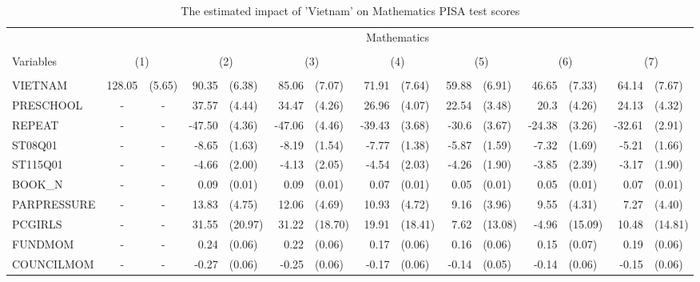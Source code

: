 \documentclass[10pt]{article}
\begin{document}
	
	\begin{table}[htbp]
		\footnotesize
		\def\arraystretch{1}
		\def\tabcolsep{4}
		\centering
		\caption{The estimated impact of 'Vietnam' on Mathematics PISA test scores}
    \begin{tabular}{lrlrlrlrlrlrlrl}
    \toprule
    \midrule
          & \multicolumn{14}{c}{Mathematics} \\
          \cline{2-15} \\
    Variables & \multicolumn{2}{c}{(1)} & \multicolumn{2}{c}{(2)} & \multicolumn{2}{c}{(3)} & \multicolumn{2}{c}{(4)} & \multicolumn{2}{c}{(5)} & \multicolumn{2}{c}{(6)} & \multicolumn{2}{c}{(7)} \\
	\hline\\
    VIETNAM & 128.05 & (5.65) & 90.35 & (6.38) & 85.06 & (7.07) & 71.91 & (7.64) & 59.88 & (6.91) & 46.65 & (7.33) & 64.14 & (7.67) \\
    PRESCHOOL & \multicolumn{1}{c}{-} & \multicolumn{1}{c}{-} & 37.57 & (4.44) & 34.47 & (4.26) & 26.96 & (4.07) & 22.54 & (3.48) & 20.3  & (4.26) & 24.13 & (4.32) \\
    REPEAT & \multicolumn{1}{c}{-} & \multicolumn{1}{c}{-} & -47.50 & (4.36) & -47.06 & (4.46) & -39.43 & (3.68) & -30.6 & (3.67) & -24.38 & (3.26) & -32.61 & (2.91) \\
    ST08Q01 & \multicolumn{1}{c}{-} & \multicolumn{1}{c}{-} & -8.65 & (1.63) & -8.19 & (1.54) & -7.77 & (1.38) & -5.87 & (1.59) & -7.32 & (1.69) & -5.21 & (1.66) \\
    ST115Q01 & \multicolumn{1}{c}{-} & \multicolumn{1}{c}{-} & -4.66 & (2.00) & -4.13 & (2.05) & -4.54 & (2.03) & -4.26 & (1.90) & -3.85 & (2.39) & -3.17 & (1.90) \\
    BOOK\_N & \multicolumn{1}{c}{-} & \multicolumn{1}{c}{-} & 0.09  & (0.01) & 0.09  & (0.01) & 0.07  & (0.01) & 0.05  & (0.01) & 0.05  & (0.01) & 0.07  & (0.01) \\
    PARPRESSURE & \multicolumn{1}{c}{-} & \multicolumn{1}{c}{-} & 13.83 & (4.75) & 12.06 & (4.69) & 10.93 & (4.72) & 9.16  & (3.96) & 9.55  & (4.31) & 7.27  & (4.40) \\
    PCGIRLS & \multicolumn{1}{c}{-} & \multicolumn{1}{c}{-} & 31.55 & (20.97) & 31.22 & (18.70) & 19.91 & (18.41) & 7.62  & (13.08) & -4.96 & (15.09) & 10.48 & (14.81) \\
    FUNDMOM & \multicolumn{1}{c}{-} & \multicolumn{1}{c}{-} & 0.24  & (0.06) & 0.22  & (0.06) & 0.17  & (0.06) & 0.16  & (0.06) & 0.15  & (0.07) & 0.19  & (0.06) \\
    COUNCILMOM & \multicolumn{1}{c}{-} & \multicolumn{1}{c}{-} & -0.27 & (0.06) & -0.25 & (0.06) & -0.17 & (0.06) & -0.14 & (0.05) & -0.14 & (0.06) & -0.15 & (0.06) \\

\end{tabular}
\end{table}
\end{document}
